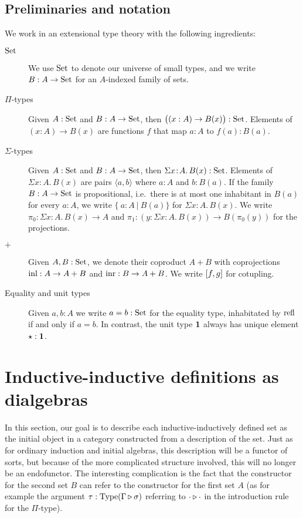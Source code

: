 \documentclass[orivec,envcountsame, ,envcountsect]{llncs}
\begin{document}
\subsection{Preliminaries and notation}

We work in an extensional type theory \cite{NPS1990book} with the
following ingredients:
\begin{description}
\item[$\text{Set}$] We use $\text{Set}$ to denote our universe of small types, and
  we write $B : A \to \text{Set}$ for an $A$-indexed family of sets.
\item[$\Pi$-types] Given $A : \text{Set}$ and $B : A \to \text{Set}$, then $\big((x :
  A) \to B(x)\big) : \text{Set}$.  Elements of $(x : A) \to B(x)$ are
  functions $f$ that map $a : A$ to $f(a) : B(a)$.
\item[$\Sigma$-types] Given $A : \text{Set}$ and $B : A \to \text{Set}$, then
  $\Sigma x\!:\!A.\, B(x) : \text{Set}$. Elements of $\Sigma x\!:\!A.\,
  B(x)$ are pairs $\langle a, b\rangle$ where $a : A$ and $b : B(a)$.
  If the family $B : A \to \text{Set}$ is propositional, i.e.\ there is at
  most one inhabitant in $B(a)$ for every $a : A$, we write $\{\ a :
  A\ |\ B(a)\}$ for $\Sigma x\!:\!A.\, B(x)$. We write $\pi_0 : \Sigma
  x\!:\!A.\, B(x) \to A$ and $\pi_1 : (y : \Sigma x\!:\!A.\, B(x)) \to
  B(\pi_0(y))$ for the projections.
\item[$+$] Given $A, B : \text{Set}$, we denote their coproduct $A + B$ with
  coprojections $\text{inl} : A \to A + B$ and $\text{inr} : B \to A + B$. We
  write $[f, g]$ for cotupling.
\item[Equality and unit types] Given $a, b : A$ we write $a = b :
  \text{Set}$ for the equality type, inhabitated by $\text{refl}$ if and only if
  $a = b$. In contrast, the unit type $\mathbf{1}$ always has unique element
  $\star : \mathbf{1}$.
\end{description}
\section{Inductive-inductive definitions as dialgebras}
\label{sec:indind-as-dialg}

In this section, our goal is to describe each inductive-inductively
defined set as the initial object in a category constructed from a
description of the set. Just as for ordinary induction and initial
algebras, this description will be a functor of sorts, but because of
the more complicated structure involved, this will no longer be an
endofunctor.
The interesting complication is the fact that the
constructor for the second set $B$ can refer to the constructor for
the first set $A$ (as for example the argument $\tau :
\text{Type}(\Gamma \triangleright \sigma)$ referring to
$\cdot \triangleright \cdot$ in the introduction rule for the
$\Pi$-type). 
\end{document}
